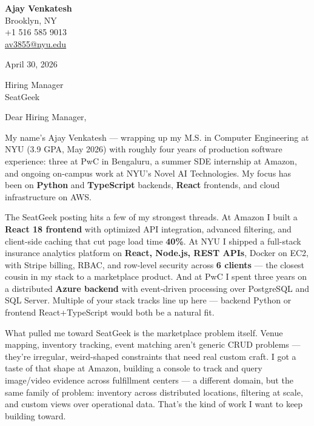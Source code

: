 \documentclass[letterpaper,11pt]{article}
\begin{document}
\begin{flushleft}
\textbf{\large Ajay Venkatesh} \\
Brooklyn, NY \\
+1 516 585 9013 \\
\href{mailto:av3855@nyu.edu}{av3855@nyu.edu}
\end{flushleft}

\vspace{10pt}

April 30, 2026

\vspace{6pt}

Hiring Manager \\
SeatGeek

\vspace{10pt}

Dear Hiring Manager,

My name's Ajay Venkatesh --- wrapping up my M.S. in Computer Engineering at NYU (3.9 GPA, May 2026) with roughly four years of production software experience: three at PwC in Bengaluru, a summer SDE internship at Amazon, and ongoing on-campus work at NYU's Novel AI Technologies. My focus has been on \textbf{Python} and \textbf{TypeScript} backends, \textbf{React} frontends, and cloud infrastructure on AWS.

The SeatGeek posting hits a few of my strongest threads. At Amazon I built a \textbf{React 18 frontend} with optimized API integration, advanced filtering, and client-side caching that cut page load time \textbf{40\%}. At NYU I shipped a full-stack insurance analytics platform on \textbf{React, Node.js, REST APIs}, Docker on EC2, with Stripe billing, RBAC, and row-level security across \textbf{6 clients} --- the closest cousin in my stack to a marketplace product. And at PwC I spent three years on a distributed \textbf{Azure backend} with event-driven processing over PostgreSQL and SQL Server. Multiple of your stack tracks line up here --- backend Python or frontend React+TypeScript would both be a natural fit.

What pulled me toward SeatGeek is the marketplace problem itself. Venue mapping, inventory tracking, event matching aren't generic CRUD problems --- they're irregular, weird-shaped constraints that need real custom craft. I got a taste of that shape at Amazon, building a console to track and query image/video evidence across fulfillment centers --- a different domain, but the same family of problem: inventory across distributed locations, filtering at scale, and custom views over operational data. That's the kind of work I want to keep building toward.
\end{document}

